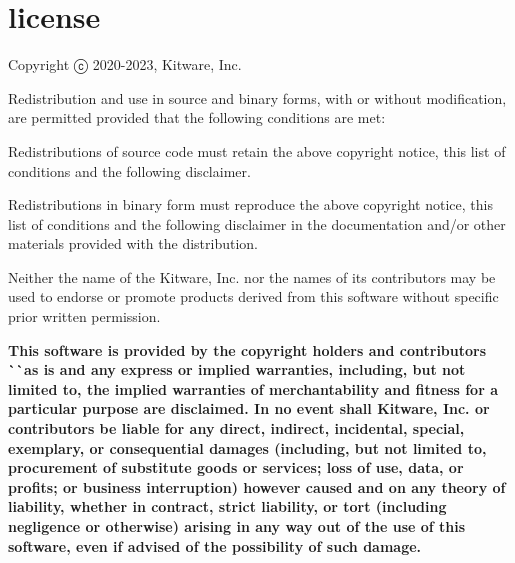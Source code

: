 \chapter{license }
\hypertarget{md__c_1_2_users_2altay_2_one_drive_2_projects_2etrek_2_third_party_libraries_2vtk_2share_2licenses_2_v_t_k_2vtktoken_2license}{}\label{md__c_1_2_users_2altay_2_one_drive_2_projects_2etrek_2_third_party_libraries_2vtk_2share_2licenses_2_v_t_k_2vtktoken_2license}
Copyright ⓒ 2020-\/2023, Kitware, Inc.

Redistribution and use in source and binary forms, with or without modification, are permitted provided that the following conditions are met:\+


\begin{DoxyItemize}
\item Redistributions of source code must retain the above copyright notice, this list of conditions and the following disclaimer.
\item Redistributions in binary form must reproduce the above copyright notice, this list of conditions and the following disclaimer in the documentation and/\+or other materials provided with the distribution.
\item Neither the name of the Kitware, Inc. nor the names of its contributors may be used to endorse or promote products derived from this software without specific prior written permission.
\end{DoxyItemize}

{\bfseries{This software is provided by the copyright holders and contributors \`{}\`{}as is\textquotesingle{}\textquotesingle{} and any express or implied warranties, including, but not limited to, the implied warranties of merchantability and fitness for a particular purpose are disclaimed. In no event shall Kitware, Inc. or contributors be liable for any direct, indirect, incidental, special, exemplary, or consequential damages (including, but not limited to, procurement of substitute goods or services; loss of use, data, or profits; or business interruption) however caused and on any theory of liability, whether in contract, strict liability, or tort (including negligence or otherwise) arising in any way out of the use of this software, even if advised of the possibility of such damage.}} 